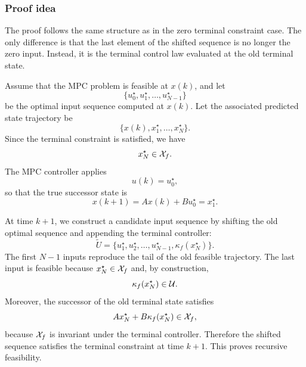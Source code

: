 \subsubsection{Proof idea}

The proof follows the same structure as in the zero terminal constraint case. The only difference
is that the last element of the shifted sequence is no longer the zero input. Instead, it is the
terminal control law evaluated at the old terminal state.

Assume that the MPC problem is feasible at \(x(k)\), and let
\[
    \{u_0^\star,u_1^\star,\ldots,u_{N-1}^\star\}
\]
be the optimal input sequence computed at \(x(k)\). Let the associated predicted state trajectory
be
\[
    \{x(k),x_1^\star,\ldots,x_N^\star\}.
\]
Since the terminal constraint is satisfied, we have
\[
    x_N^\star\in\mathcal{X}_f.
\]
The MPC controller applies
\[
    u(k)=u_0^\star,
\]
so that the true successor state is
\[
    x(k+1)=Ax(k)+Bu_0^\star=x_1^\star.
\]

At time \(k+1\), we construct a candidate input sequence by shifting the old optimal sequence
and appending the terminal controller:
\[
    \widetilde{U}
    =
    \{u_1^\star,u_2^\star,\ldots,u_{N-1}^\star,\kappa_f(x_N^\star)\}.
\]
The first \(N-1\) inputs reproduce the tail of the old feasible trajectory. The last input is
feasible because \(x_N^\star\in\mathcal{X}_f\) and, by construction,
\[
    \kappa_f(x_N^\star)\in\mathcal{U}.
\]
Moreover, the successor of the old terminal state satisfies
\[
    Ax_N^\star+B\kappa_f(x_N^\star)\in\mathcal{X}_f,
\]
because \(\mathcal{X}_f\) is invariant under the terminal controller. Therefore the shifted sequence
satisfies the terminal constraint at time \(k+1\). This proves recursive feasibility.

